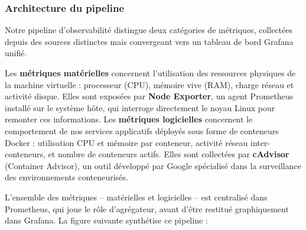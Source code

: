 \documentclass[10pt,twocolumn,a4paper]{article}
\begin{document}
\subsubsection{Architecture du pipeline}
Notre pipeline d'observabilité distingue deux catégories de métriques, collectées depuis des sources distinctes mais convergeant vers un tableau de bord Grafana unifié.

Les \textbf{métriques matérielles} concernent l'utilisation des ressources physiques de la machine virtuelle : processeur (CPU), mémoire vive (RAM), charge réseau et activité disque. Elles sont exposées par \textbf{Node Exporter}, un agent Prometheus installé sur le système hôte, qui interroge directement le noyau Linux pour remonter ces informations.
Les \textbf{métriques logicielles} concernent le comportement de nos services applicatifs déployés sous forme de conteneurs Docker : utilisation CPU et mémoire par conteneur, activité réseau inter-conteneurs, et nombre de conteneurs actifs. Elles sont collectées par \textbf{cAdvisor} (Container Advisor), un outil développé par Google spécialisé dans la surveillance des environnements conteneurisés.

L'ensemble des métriques -- matérielles et logicielles -- est centralisé dans Prometheus, qui joue le rôle d'agrégateur, avant d'être restitué graphiquement dans Grafana. La figure suivante synthétise ce pipeline :
\end{document}

